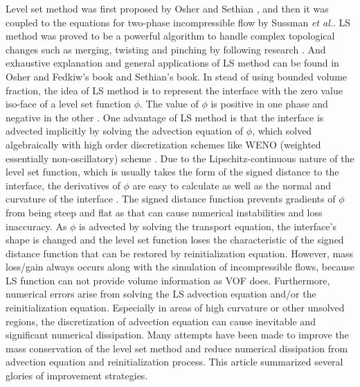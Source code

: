  Level set method was first proposed by Osher and Sethian \cite{osher1988fronts}, and then it was coupled to the equations for two-phase incompressible flow by Sussman \textit{et al.}\cite{Sussman1994A}. LS method was proved to be a powerful algorithm to handle complex topological changes such as merging, twisting and pinching by following research \cite{Sussman1995A,chang1996level,sussman1998improved}. And exhaustive explanation and general applications of LS method can be found in Osher and Fedkiw's book\cite{osher2006level} and Sethian's book\cite{sethian1999level}. In stead of using bounded volume fraction, the idea of LS method is to represent the interface with the zero value iso-face of a level set function $\phi$. The value of $\phi$ is positive in one phase and negative in the other \cite{chopp1991computing}. One advantage of LS method is that the interface is advected implicitly by solving the advection equation of $\phi$, which solved algebraically with high order discretization schemes like WENO (weighted essentially non-oscillatory) scheme \cite{liu2017coupled,son2002coupled,martin2018implementation}.
Due to the Lipschitz-continuous nature of the level set function, which is usually takes the form of the signed distance to the interface, the derivatives of $\phi$ are easy to calculate as well as the normal and curvature of the interface \cite{ge2018efficient}. The signed distance function prevents gradients of $\phi$ from being steep and flat as that can cause numerical instabilities and loss inaccuracy.  As $\phi$ is advected by solving the transport equation, the interface's shape is changed and the level set function loses the characteristic of the signed distance function that can be restored by reinitialization equation\cite{Sussman1994A,Johansson422383}. However, mass loss/gain always occurs along with the simulation of incompressible flows, because LS function can not provide volume information as VOF does. Furthermore, numerical errors arise from solving the LS advection equation and/or the reinitialization equation. Especially in areas of high curvature or other unsolved regions, the discretization of advection equation can cause inevitable and significant numerical dissipation\cite{losasso2006spatially}. Many attempts have been made to improve the mass conservation of the level set method and reduce numerical dissipation from advection equation and reinitialization process. This article \cite{luo2015mass} summarized several glories of improvement strategies.

